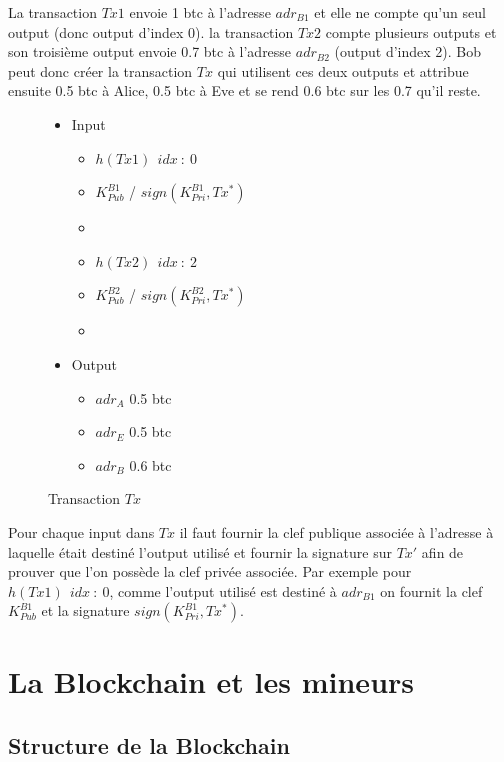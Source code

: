 \documentclass[11pt,a4paper]{article}
\begin{document}
La transaction $Tx1$ envoie 1 btc à l'adresse $adr_{B1}$ et elle ne compte qu'un seul output (donc output d'index 0). la transaction $Tx2$ compte plusieurs outputs et son troisième output envoie 0.7 btc à l'adresse $adr_{B2}$ (output d'index 2). Bob peut donc créer la transaction $Tx$ qui utilisent ces deux outputs et attribue ensuite 0.5 btc à Alice, 0.5 btc à Eve et se rend 0.6 btc sur les 0.7 qu'il reste.

\begin{figure}[H]
\begin{itemize}
\renewcommand{\labelitemi}{$\bullet$}
\renewcommand{\labelitemii}{$\star$}

\item Input
\begin{itemize}
\item $h(Tx1)~~idx~:~0$
\item $K_{Pub}^{B1}$ / $sign(K_{Pri}^{B1}, Tx^*)$
\item[ ]
\item $h(Tx2)~~idx~:~2$
\item $K_{Pub}^{B2}$ / $sign(K_{Pri}^{B2}, Tx^*)$
\item[ ]
\end{itemize}

\item Output
\begin{itemize}
\item $adr_A$ 0.5 btc
\item $adr_E$ 0.5 btc
\item $adr_B$ 0.6 btc
\end{itemize}

\end{itemize}

\caption{Transaction $Tx$}
\end{figure}


Pour chaque input dans $Tx$ il faut fournir la clef publique associée à l'adresse à laquelle était destiné l'output utilisé et fournir la signature sur $Tx'$ afin de prouver que l'on possède la clef privée associée. Par exemple pour $h(Tx1)~~idx~:~0$, comme l'output utilisé est destiné à $adr_{B1}$ on fournit la clef $K_{Pub}^{B1}$ et la signature $sign(K_{Pri}^{B1}, Tx^*)$.


\section{La Blockchain et les mineurs}
\subsection{Structure de la Blockchain}
\end{document}

